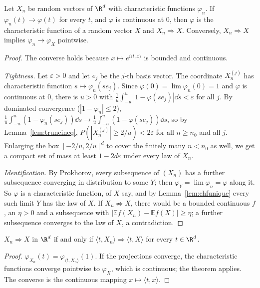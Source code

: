 \begin{theorem}\label{thm:levycont}
Let $X_n$ be random vectors of $\R^d$ with characteristic functions $\varphi_n$. If $\varphi_n(t)\to\varphi(t)$ for every $t$, and $\varphi$ is continuous at
$0$, then $\varphi$ is the characteristic function of a random vector $X$ and $X_n\Rightarrow X$. Conversely, $X_n\Rightarrow X$ implies $\varphi_n\to\varphi_X$
pointwise.
\end{theorem}
\begin{proof}
The converse holds because $x\mapsto e^{i\langle t,x\rangle}$ is bounded and continuous.

\emph{Tightness.} Let $\varepsilon>0$ and let $e_j$ be the $j$-th basis vector. The coordinate $X_n^{(j)}$ has characteristic function $s\mapsto\varphi_n(se_j)$.
Since $\varphi(0)=\lim\varphi_n(0)=1$ and $\varphi$ is continuous at $0$, there is $u>0$ with $\frac1u\int_{-u}^u|1-\varphi(se_j)|\dd s<\varepsilon$ for all $j$. By
dominated convergence ($|1-\varphi_n|\le2$), $\frac1u\int_{-u}^u(1-\varphi_n(se_j))\dd s\to\frac1u\int_{-u}^u(1-\varphi(se_j))\dd s$, so by
Lemma~\ref{lem:truncineq}, $P(|X_n^{(j)}|\ge2/u)<2\varepsilon$ for all $n\ge n_0$ and all $j$. Enlarging the box $[-2/u,2/u]^d$ to cover the finitely many
$n<n_0$ as well, we get a compact set of mass at least $1-2d\varepsilon$ under every law of $X_n$.

\emph{Identification.} By Prokhorov, every subsequence of $(X_n)$ has a further subsequence converging in distribution to some $Y$; then $\varphi_Y=\lim\varphi_n
=\varphi$ along it. So $\varphi$ is a characteristic function, of $X$ say, and by Lemma~\ref{lem:chfunique} every such limit $Y$ has the law of $X$. If
$X_n\not\Rightarrow X$, there would be a bounded continuous $f$, an $\eta>0$ and a subsequence with $|\mathbb E f(X_n)-\mathbb E f(X)|\ge\eta$; a further
subsequence converges to the law of $X$, a contradiction.
\end{proof}

\begin{corollary}\label{cor:cramerwold}
$X_n\Rightarrow X$ in $\R^d$ if and only if $\langle t,X_n\rangle\Rightarrow\langle t,X\rangle$ for every $t\in\R^d$.
\end{corollary}
\begin{proof}
$\varphi_{X_n}(t)=\varphi_{\langle t,X_n\rangle}(1)$. If the projections converge, the characteristic functions converge pointwise to $\varphi_X$, which is
continuous; the theorem applies. The converse is the continuous mapping $x\mapsto\langle t,x\rangle$.
\end{proof}


